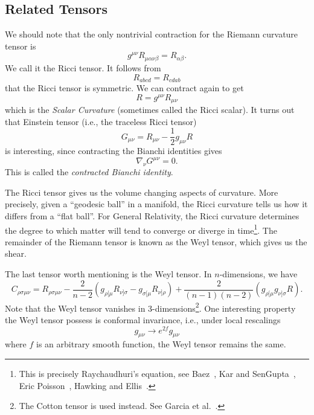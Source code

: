 \subsection{Related Tensors}
We should note that the only nontrivial contraction for the
Riemann curvature tensor is
\begin{equation}
g^{\mu\nu}R_{\mu\alpha\nu\beta}=R_{\alpha\beta}.
\end{equation}
We call it the Ricci tensor. It follows from
\begin{equation}
R_{abcd}=R_{cdab}
\end{equation}
that the Ricci tensor is symmetric. We can contract
again to get
\begin{equation}
R=g^{\mu\nu}R_{\mu\nu}
\end{equation}
which is the \emph{Scalar Curvature} (sometimes called the Ricci scalar).
It turns out that Einstein tensor (i.e., the traceless Ricci
tensor)
\begin{equation}
G_{\mu\nu}=R_{\mu\nu}-\frac{1}{2}g_{\mu\nu}R
\end{equation}
is interesting, since contracting the Bianchi identities gives
\begin{equation}
\nabla_{\nu}G^{\mu\nu}=0.
\end{equation}
This is called the \emph{contracted Bianchi identity}.

The Ricci tensor gives us the volume changing aspects of
curvature. More precisely, given a ``geodesic ball'' in a
manifold, the Ricci curvature tells us how it differs from a
``flat ball''. For General Relativity, the Ricci curvature
determines the degree to which matter will tend to converge or
diverge in time\footnote{This is precisely Raychaudhuri's
  equation, see Baez~\cite{Baez:2001qy}, Kar and SenGupta~\cite{Kar:2006ms}, Eric Poisson~\cite[\normalfont\S2]{poisson}, Hawking and Ellis~\cite[\normalfont\S4.1]{Hawking:1973uf}.}. 
The remainder of the Riemann tensor is known as the Weyl tensor,
which gives us the shear.

The last tensor worth mentioning is the Weyl
tensor. In
$n$-dimensions, we have
\begin{equation}
C_{\rho\sigma\mu\nu}=R_{\rho\sigma\mu\nu}-\frac{2}{n-2}(g_{\rho[\mu}R_{\nu]\sigma}-g_{\sigma[\mu}R_{\nu]\rho})+\frac{2}{(n-1)(n-2)}(g_{\rho[\mu}g_{\nu]\sigma}R).
\end{equation}
Note that the Weyl tensor vanishes in 3-dimensions\footnote{The Cotton tensor is used instead. See Garcia et al.~\cite{Garcia:2003bw}.}. One interesting property the
Weyl tensor possess is conformal invariance, i.e., under local
rescalings
\begin{equation}
g_{\mu\nu}\to e^{2f}g_{\mu\nu}
\end{equation}
where $f$ is an arbitrary smooth function, the Weyl tensor
remains the same.
